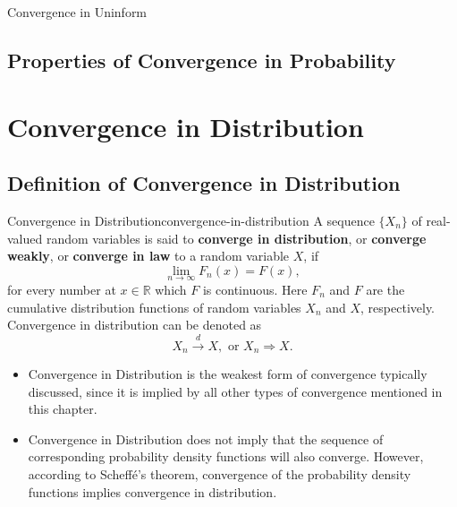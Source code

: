 \begin{definition}{Convergence in Uninform}{}
    
\end{definition}

\subsection{Properties of Convergence in Probability}

\section{Convergence in Distribution}

\subsection{Definition of Convergence in Distribution}

\begin{definition}{Convergence in Distribution}{convergence-in-distribution}
    A sequence $\{X_n\}$ of real-valued random variables is said to \textbf{converge in distribution}, or \textbf{converge weakly}, or \textbf{converge in law} to a random variable $X$, if
    \begin{equation}
        \lim_{n\to\infty}F_n(x)=F(x),
    \end{equation}
    for every number at $x\in\mathbb{R}$ which $F$ is continuous. Here $F_n$ and $F$ are the cumulative distribution functions of random variables $X_n$ and $X$, respectively. Convergence in distribution can be denoted as
    \begin{equation}
        X_n \stackrel{d}{\rightarrow} X, \text{ or } X_n \Rightarrow X.
    \end{equation}
\end{definition}

\begin{note}
    \begin{itemize}
        \item Convergence in Distribution is the weakest form of convergence typically discussed, since it is implied by all other types of convergence mentioned in this chapter.
        \item Convergence in Distribution does not imply that the sequence of corresponding probability density functions will also converge. However, according to Scheff\'e's theorem, convergence of the probability density functions implies convergence in distribution.
    \end{itemize}
\end{note}

